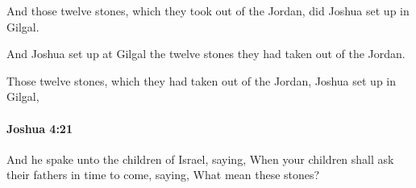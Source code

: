 			\begin{versebox}
					\item[BHS] 
					\item[ASV] And those twelve stones, which they took out of the Jordan, did Joshua set up in Gilgal.
					\item[NIV] And Joshua set up at Gilgal the twelve stones they had taken out of the Jordan.
					\item[NRSV] Those twelve stones, which they had taken out of the Jordan, Joshua set up in Gilgal,
			\end{versebox}

		\paragraph{Joshua 4:21} %
			\label{JOSHUA-4-21}

			And he spake unto the children of Israel, saying, When your children shall ask their fathers in time to come, saying, What mean these stones?

